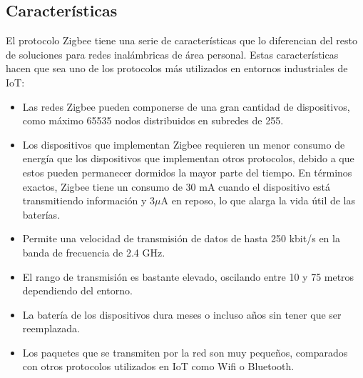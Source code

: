 \subsection{Características} %
El protocolo Zigbee tiene una serie de características que lo diferencian del resto de soluciones para redes inalámbricas de área personal. Estas características hacen que sea uno de los protocolos más utilizados en entornos industriales de IoT:
\begin{itemize}
\item Las redes Zigbee pueden componerse de una gran cantidad de dispositivos, como máximo 65535 nodos distribuidos en subredes de 255.
\item Los dispositivos que implementan Zigbee requieren un menor consumo de energía que los dispositivos que implementan otros protocolos, debido a que estos pueden permanecer dormidos la mayor parte del tiempo. En términos exactos, Zigbee tiene un consumo de 30 mA cuando el dispositivo está transmitiendo información y 3$\mu$A en reposo, lo que alarga la vida útil de las baterías.
\item Permite una velocidad de transmisión de datos de hasta 250 kbit/s en la banda de frecuencia de 2.4 GHz.
\item El rango de transmisión es bastante elevado, oscilando entre 10 y 75 metros dependiendo del entorno.
\item La batería de los dispositivos dura meses o incluso años sin tener que ser reemplazada.
\item Los paquetes que se transmiten por la red son muy pequeños, comparados con otros protocolos utilizados en IoT como Wifi o Bluetooth.
\end{itemize}
\clearpage




